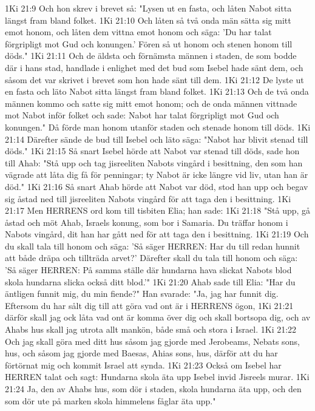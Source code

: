 1Ki 21:9  Och hon skrev i brevet så: "Lysen ut en fasta, och låten Nabot sitta längst fram bland folket.
1Ki 21:10  Och låten så två onda män sätta sig mitt emot honom, och låten dem vittna emot honom och säga: 'Du har talat förgripligt mot Gud och konungen.' Fören så ut honom och stenen honom till döds."
1Ki 21:11  Och de äldsta och förnämsta männen i staden, de som bodde där i hans stad, handlade i enlighet med det bud som Isebel hade sänt dem, och såsom det var skrivet i brevet som hon hade sänt till dem.
1Ki 21:12  De lyste ut en fasta och läto Nabot sitta längst fram bland folket.
1Ki 21:13  Och de två onda männen kommo och satte sig mitt emot honom; och de onda männen vittnade mot Nabot inför folket och sade: Nabot har talat förgripligt mot Gud och konungen." Då förde man honom utanför staden och stenade honom till döds.
1Ki 21:14  Därefter sände de bud till Isebel och läto säga: "Nabot har blivit stenad till döds."
1Ki 21:15  Så snart Isebel hörde att Nabot var stenad till döds, sade hon till Ahab: "Stå upp och tag jisreeliten Nabots vingård i besittning, den som han vägrade att låta dig få för penningar; ty Nabot är icke längre vid liv, utan han är död."
1Ki 21:16  Så snart Ahab hörde att Nabot var död, stod han upp och begav sig åstad ned till jisreeliten Nabots vingård för att taga den i besittning.
1Ki 21:17  Men HERRENS ord kom till tisbiten Elia; han sade:
1Ki 21:18  "Stå upp, gå åstad och möt Ahab, Israels konung, som bor i Samaria. Du träffar honom i Nabots vingård, dit han har gått ned för att taga den i besittning.
1Ki 21:19  Och du skall tala till honom och säga: 'Så säger HERREN: Har du till redan hunnit att både dräpa och tillträda arvet?' Därefter skall du tala till honom och säga: 'Så säger HERREN: På samma ställe där hundarna hava slickat Nabots blod skola hundarna slicka också ditt blod.'"
1Ki 21:20  Ahab sade till Elia: "Har du äntligen funnit mig, du min fiende?" Han svarade: "Ja, jag har funnit dig. Eftersom du har sålt dig till att göra vad ont är i HERRENS ögon,
1Ki 21:21  därför skall jag ock låta vad ont är komma över dig och skall bortsopa dig, och av Ahabs hus skall jag utrota allt mankön, både små och stora i Israel.
1Ki 21:22  Och jag skall göra med ditt hus såsom jag gjorde med Jerobeams, Nebats sons, hus, och såsom jag gjorde med Baesas, Ahias sons, hus, därför att du har förtörnat mig och kommit Israel att synda.
1Ki 21:23  Också om Isebel har HERREN talat och sagt: Hundarna skola äta upp Isebel invid Jisreels murar.
1Ki 21:24  Ja, den av Ahabs hus, som dör i staden, skola hundarna äta upp, och den som dör ute på marken skola himmelens fåglar äta upp."
